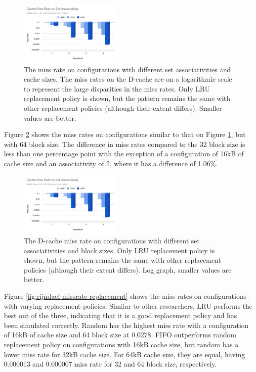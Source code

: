 \documentclass[conference]{IEEEtran}
\begin{document}
\begin{figure}[H]
    \centering
    \includegraphics[width=0.45\textwidth]{images/missrate_assoc_32}
    \caption{The miss rate on configurations with different set associativities and cache sizes. The miss rates on the D-cache are on a logarithmic scale to represent the large disparities in the miss rates. Only LRU replacement policy is shown, but the pattern remains the same with other replacement policies (although their extent differs). Smaller values are better.}
    \label{fig:rijndael-missrate-assoc-32}
\end{figure}

Figure \ref{fig:rijndael-missrate-assoc-64} shows the miss rates on configurations similar to that on Figure \ref{fig:rijndael-missrate-assoc-32}, but with 64 block size. The difference in miss rates compared to the 32 block size is less than one percentage point with the exception of a configuration of 16kB of cache size and an associativity of 2, where it has a difference of 1.06\%.

\begin{figure}[H]
  \centering
  \includegraphics[width=0.45\textwidth]{images/missrate_assoc_64}
  \caption{The D-cache miss rate on configurations with different set associativities and block sizes. Only LRU replacement policy is shown, but the pattern remains the same with other replacement policies (although their extent differs). Log graph, smaller values are better.}
  \label{fig:rijndael-missrate-assoc-64}
\end{figure}

Figure \ref{fig:rijndael-missrate-replacement} shows the miss rates on configurations with varying replacement policies. Similar to other researchers, LRU performs the best out of the three, indicating that it is a good replacement policy and has been simulated correctly. Random has the highest miss rate with a configuration of 16kB of cache size and 64 block size at 0.0278. FIFO outperforms random replacement policy on configurations with 16kB cache size, but random has a lower miss rate for 32kB cache size. For 64kB cache size, they are equal, having 0.000013 and 0.000007 miss rate for 32 and 64 block size, respectively.
\end{document}
